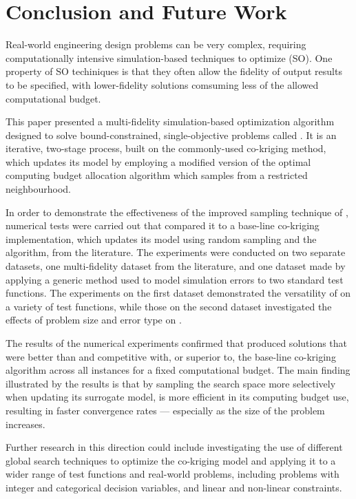 \section{Conclusion and Future Work}\label{sec:conc}
Real-world engineering design problems can be very complex, requiring computationally intensive simulation-based techniques to optimize (SO). One property of SO techiniques is that they often allow the fidelity of output results to be specified, with lower-fidelity solutions comsuming less of the allowed computational budget.

This paper presented a multi-fidelity simulation-based optimization algorithm designed to solve bound-constrained, single-objective problems called \AlgName{}. It is an iterative, two-stage process, built on the commonly-used co-kriging method, which updates its model by employing a modified version of the optimal computing budget allocation algorithm which samples from a restricted neighbourhood.  

In order to demonstrate the effectiveness of the improved sampling technique of \AlgName{}, numerical tests were carried out that compared it to a base-line co-kriging implementation, which updates its model using random sampling and the \motos{} algorithm, from the literature. The experiments were conducted on two separate datasets, one multi-fidelity dataset from the literature, and one dataset made by applying a generic method used to model simulation errors to two standard test functions. The experiments on the first dataset demonstrated the versatility of \AlgName{} on a variety of test functions, while those on the second dataset investigated the effects of problem size and error type on \AlgName{}.

The results of the numerical experiments confirmed that \AlgName{} produced solutions that were better than \motos{} and competitive with, or superior to, the base-line co-kriging algorithm across all instances for a fixed computational budget. The main finding illustrated by the results is that by sampling the search space more selectively when updating its surrogate model, \AlgName{} is more efficient in its computing budget use, resulting in faster convergence rates --- especially as the size of the problem increases.

Further research in this direction could include investigating the use of different global search techniques to optimize the co-kriging model and applying it to a wider range of test functions and real-world problems, including problems with integer and categorical decision variables, and linear and non-linear constraints.